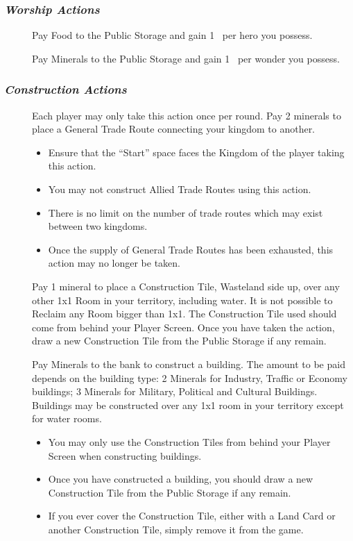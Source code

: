 \documentclass[10pt,twocolumn]{article}
\begin{document}
\subsubsection*{\textit{Worship Actions}}
\begin{description}
\item[] Pay  Food to the Public Storage and gain 1 \vp\ per hero you possess.
\item[] Pay  Minerals to the Public Storage and gain 1 \vp\ per wonder you possess.
\end{description}

\subsubsection*{\textit{Construction Actions}}
\begin{description}
\item[] Each player may only take this action once per round. Pay 2 minerals to place a General Trade Route connecting your kingdom to another.
\begin{itemize}
\item Ensure that the ``Start'' space faces the Kingdom of the player taking this action.
\item You may not construct Allied Trade Routes using this action.
\item There is no limit on the number of trade routes which may exist between two kingdoms.
\item Once the supply of General Trade Routes has been exhausted, this action may no longer be taken.
\end{itemize}
\item[] Pay 1 mineral to place a Construction Tile, Wasteland side up, over any other 1x1 Room in your territory, including water. It is not possible to Reclaim any Room bigger than 1x1. The Construction Tile used should come from behind your Player Screen. Once you have taken the action, draw a new Construction Tile from the Public Storage if any remain.
\item[] Pay Minerals to the bank to construct a building. The amount to be paid depends on the building type: 2 Minerals for Industry, Traffic or Economy buildings; 3 Minerals for Military, Political and Cultural Buildings. Buildings may be constructed over any 1x1 room in your territory except for water rooms.
\begin{itemize}
\item You may only use the Construction Tiles from behind your Player Screen when constructing buildings.
\item Once you have constructed a building, you should draw a new Construction Tile from the Public Storage if any remain.
\item If you ever cover the Construction Tile, either with a Land Card or another Construction Tile, simply remove it from the game.
\end{itemize}
\end{description}
\end{document}
